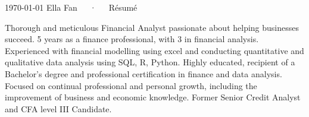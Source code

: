 \documentclass[11pt, a4paper]{awesome-cv}
\begin{document}
\makecvheader[C]

\makecvfooter
  {\today}
  {Ella Fan~~~·~~~Résumé}
  {\thepage}


% 
% 
% 
% 
% 



\begin{cvparagraph}

Thorough and meticulous Financial Analyst passionate about helping businesses succeed.
5 years as a finance professional, with 3 in financial analysis.
Experienced with financial modelling using excel and conducting quantitative and qualitative data analysis using SQL, R, Python.
Highly educated, recipient of a Bachelor's degree and professional certification in finance and data analysis. 
Focused on continual professional and personal growth, including the improvement of business and economic knowledge.
Former Senior Credit Analyst and CFA level III Candidate.
\end{cvparagraph}

\end{document}
